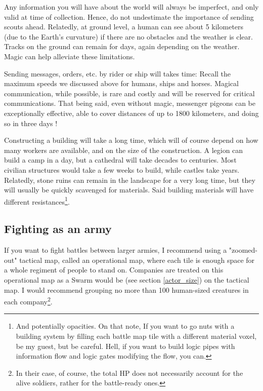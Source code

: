 Any information you will have about the world will always be imperfect, and only valid at time of collection. Hence, do not undestimate the importance of sending scouts ahead. Relatedly, at ground level, a human can see about 5 kilometers (due to the Earth's curvature) if there are no obstacles and the weather is clear. Tracks on the ground can remain for days, again depending on the weather. Magic can help alleviate these limitations. 

Sending messages, orders, etc. by rider or ship will takes time: Recall the maximum speeds we discussed above for humans, ships and horses. Magical communication, while possible, is rare and costly and will be reserved for critical communications. That being said, even without magic, messenger pigeons can be exceptionally effective, able to cover distances of up to 1800 kilometers, and doing so in three days !

Constructing a building will take a long time, which will of course depend on how many workers are available, and on the size of the construction. A legion can build a camp in a day, but a cathedral will take decades to centuries. Most civilian structures would take a few weeks to build, while castles take years. Relatedly, stone ruins can remain in the landscape for a very long time, but they will usually be quickly scavenged for materials. Said building materials will have different resistances\footnote{And potentially opacities. On that note, If you want to go nuts with a building system by filling each battle map tile with a different material voxel, be my guest, but be careful. Hell, if you want to build logic pipes with information flow and logic gates modifying the flow, you can.}.



\subsection{Fighting as an army}

If you want to fight battles between larger armies, I recommend using a "zoomed-out" tactical map, called an operational map, where each tile is enough space for a whole regiment of people to stand on. Companies are treated on this operational map as a Swarm would be (see section \ref{actor_size}) on the tactical map. I would recommend grouping no more than 100 human-sized creatures in each company\footnote{In their case, of course, the total HP does not necessarily account for the alive soldiers, rather for the battle-ready ones.}.


